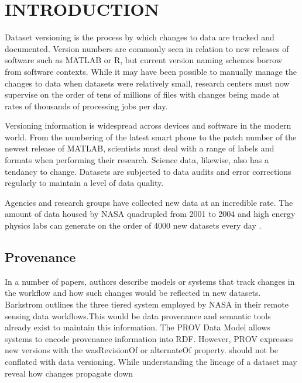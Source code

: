 
\chapter{INTRODUCTION}

Dataset versioning is the process by which changes to data are tracked and documented.  Version numbers are commonly seen in relation to new releases of software such as MATLAB or R, but current version naming schemes borrow from software contexts.  While it may have been possible to manually manage the changes to data when datasets were relatively small, research centers must now supervise on the order of tens of millions of files with changes being made at rates of thousands of processing jobs per day.

Versioning information is widespread across devices and software in the modern world.  From the numbering of the latest smart phone to the patch number of the newest release of MATLAB, scientists must deal with a range of labels and formats when performing their research.  Science data, likewise, also has a tendancy to change.  Datasets are subjected to data audits and error corrections regularly to maintain a level of data quality.

Agencies and research groups have collected new data at an incredible rate.  The amount of data housed by NASA quadrupled from 2001 to 2004 \cite{barkstromLibrary} and high energy physics labs can generate on the order of 4000 new datasets every day \cite{ATLAS}.

\section{Provenance}
In a number of papers, authors describe models or systems that track changes in the workflow and how such changes would be reflected in new datasets.  Barkstrom outlines the three tiered system employed by NASA in their remote sensing data workflows.This would be data provenance and semantic tools already exist to maintain this information.  The PROV Data Model allows systems to encode provenance information into RDF.  However, PROV expresses new versions with the wasRevisionOf or alternateOf property. should not be conflated with data versioning.  While understanding the lineage of a dataset may reveal how changes propagate down

